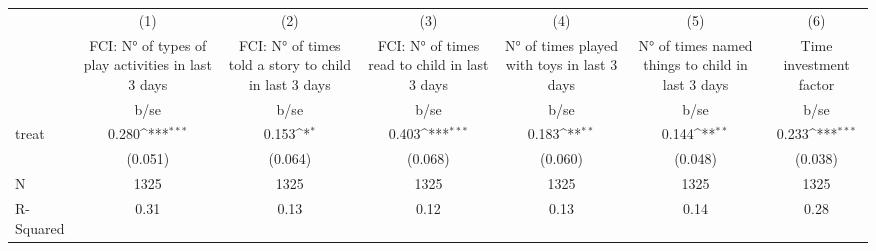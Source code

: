 {
\def\sym#1{\ifmmode^{#1}\else\(^{#1}\)\fi}
\begin{tabular}{l*{6}{c}}
\hline\hline
                    &\multicolumn{1}{c}{(1)}&\multicolumn{1}{c}{(2)}&\multicolumn{1}{c}{(3)}&\multicolumn{1}{c}{(4)}&\multicolumn{1}{c}{(5)}&\multicolumn{1}{c}{(6)}\\
                    &\multicolumn{1}{c}{FCI: N° of types of play activities in last 3 days}&\multicolumn{1}{c}{FCI: N° of times told a story to child in last 3 days}&\multicolumn{1}{c}{FCI: N° of times read to child in last 3 days}&\multicolumn{1}{c}{N° of times played with toys in last 3 days}&\multicolumn{1}{c}{N° of times named things to child in last 3 days}&\multicolumn{1}{c}{Time investment factor}\\
                    &        b/se         &        b/se         &        b/se         &        b/se         &        b/se         &        b/se         \\
\hline
treat               &       0.280\sym{***}&       0.153\sym{*}  &       0.403\sym{***}&       0.183\sym{**} &       0.144\sym{**} &       0.233\sym{***}\\
                    &     (0.051)         &     (0.064)         &     (0.068)         &     (0.060)         &     (0.048)         &     (0.038)         \\
\hline
N                   &        1325         &        1325         &        1325         &        1325         &        1325         &        1325         \\
R-Squared           &        0.31         &        0.13         &        0.12         &        0.13         &        0.14         &        0.28         \\
\hline\hline
\end{tabular}
}
